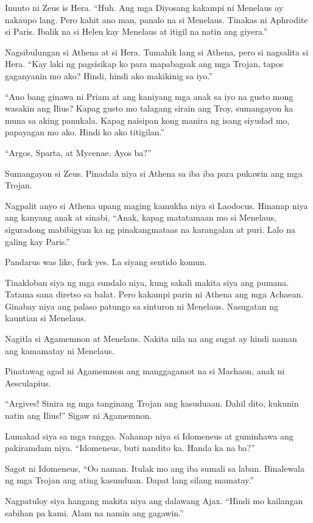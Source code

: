 \documentclass[12pt,letterpaper]{report}
\begin{document}
Inuuto ni Zeus is Hera. ``Huh. Ang mga Diyosang kakampi ni Menelaus ay nakaupo lang. Pero kahit ano man, panalo na si Menelaus. Tinakas ni Aphrodite si Paris. Ibalik na si Helen kay Menelaus at itigil na natin ang giyera.''

Nagsibulungan si Athena at si Hera. Tumahik lang si Athena, pero si nagsalita si Hera. ``Kay laki ng pagsisikap ko para mapabagsak ang mga Trojan, tapos gaganyanin mo ako? Hindi, hindi ako makikinig sa iyo.''

``Ano bang ginawa ni Priam at ang kaniyang mga anak sa iyo na gusto mong wasakin ang Ilius? Kapag gusto mo talagang sirain ang Troy, sumangayon ka muna sa aking panukala. Kapag naisipan kong manira ng isang siyudad mo, papayagan mo ako. Hindi ko ako titigilan.''

``Argos, Sparta, at Mycenae. Ayos ba?''

Sumangayon si Zeus. Pinadala niya si Athena sa iba iba para pukawin ang mga Trojan.

Nagpalit anyo si Athena upang maging kamukha niya si Laodocus. Hinanap niya ang kanyang anak at sinabi, ``Anak, kapag matatamaan mo si Menelaus, siguradong mabibigyan ka ng pinakangmataas na karangalan at puri. Lalo na galing kay Paris.''

Pandarus was like, fuck yes. La siyang sentido komun.

Tinakloban siya ng mga sundalo niya, kung sakali makita siya ang pumana. Tatama sana diretso sa balat. Pero kakampi parin ni Athena ang mga Achaean. Ginabay niya ang palaso patungo sa sinturon ni Menelaus. Nasugatan ng kauntian si Menelaus.

Nagitla si Agamemnon at Menelaus. Nakita nila na ang sugat ay hindi naman ang kamamatay ni Menelaus.

Pinatawag agad ni Agamemnon ang manggagamot na si Machaon, anak ni Aesculapius.

``Argives! Sinira ng mga tanginang Trojan ang kasuduaan. Dahil dito, kukunin natin ang Ilius!'' Sigaw ni Agamemnon.

Lumakad siya sa mga ranggo. Nahanap niya si Idomeneus at guminhawa ang pakiramdam niya. ``Idomeneus, buti nandito ka. Handa ka na ba?''

Sagot ni Idomeneus, ``Oo naman. Itulak mo ang iba sumali sa laban. Binalewala ng mga Trojan ang ating kasunduan. Dapat lang silang mamatay.''

Nagpatuloy siya hangang makita niya ang dalawang Ajax. ``Hindi mo kailangan sabihan pa kami. Alam na namin ang gagawin.''
\end{document}
